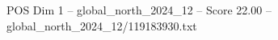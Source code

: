 \begin{textsample}{POS Dim 1 – global\_north\_2024\_12 – Score 22.00 – global\_north\_2024\_12/119183930.txt}
\end{textsample}

